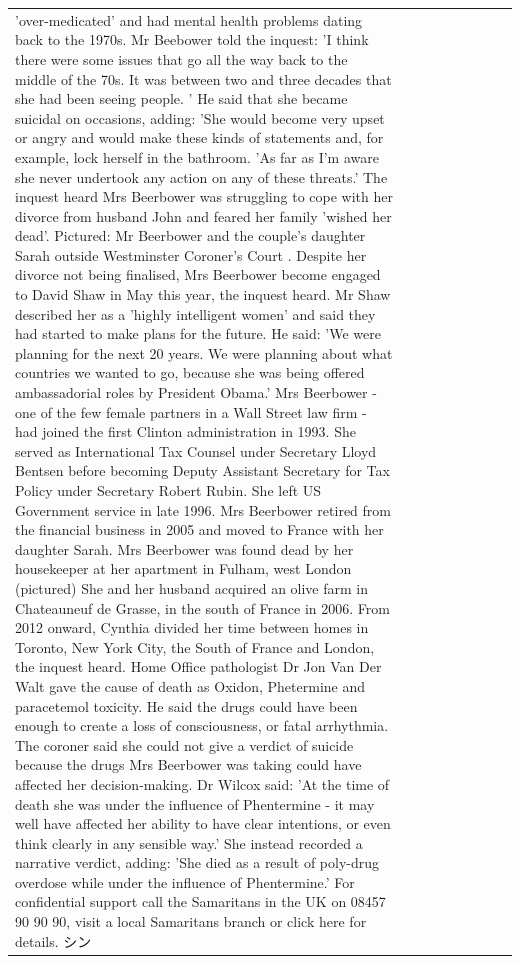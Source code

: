 \begin{table}[H]
\begin{tabular}{lllrlllll}
'over-medicated' and had mental health problems dating back to the 1970s. Mr Beebower told the inquest: 'I think there were some issues that go all the way back to the middle of the 70s. It was between two and three decades that she had been seeing people. ' He said that she became suicidal on occasions, adding: 'She would become very upset or angry and would make these kinds of statements and, for example, lock herself in the bathroom. 'As far as I'm aware she never undertook any action on any of these threats.' The inquest heard Mrs Beerbower was struggling to cope with her divorce from husband John and feared her family 'wished her dead'. Pictured: Mr Beerbower and the couple's daughter Sarah outside Westminster Coroner's Court . Despite her divorce not being finalised, Mrs Beerbower become engaged to David Shaw in May this year, the inquest heard. Mr Shaw described her as a 'highly intelligent women' and said they had started to make plans for the future. He said: 'We were planning for the next 20 years. We were planning about what countries we wanted to go, because she was being offered ambassadorial roles by President Obama.' Mrs Beerbower - one of the few female partners in a Wall Street law firm - had joined the first Clinton administration in 1993. She served as International Tax Counsel under Secretary Lloyd Bentsen before becoming Deputy Assistant Secretary for Tax Policy under Secretary Robert Rubin. She left US Government service in late 1996. Mrs Beerbower retired from the financial business in 2005 and moved to France with her daughter Sarah. Mrs Beerbower was found dead by her housekeeper at her apartment in Fulham, west London (pictured) She and her husband acquired an olive farm in Chateauneuf de Grasse, in the south of France in 2006. From 2012 onward, Cynthia divided her time between homes in Toronto, New York City, the South of France and London, the inquest heard. Home Office pathologist Dr Jon Van Der Walt gave the cause of death as Oxidon, Phetermine and paracetemol toxicity. He said the drugs could have been enough to create a loss of consciousness, or fatal arrhythmia. The coroner said she could not give a verdict of suicide because the drugs Mrs Beerbower was taking could have affected her decision-making. Dr Wilcox said: 'At the time of death she was under the influence of Phentermine - it may well have affected her ability to have clear intentions, or even think clearly in any sensible way.' She instead recorded a narrative verdict, adding: 'She died as a result of poly-drug overdose while under the influence of Phentermine.' For confidential support call the Samaritans in the UK on 08457 90 90 90, visit a local Samaritans branch or click here for details. シン \\

\end{tabular}
\end{table}
